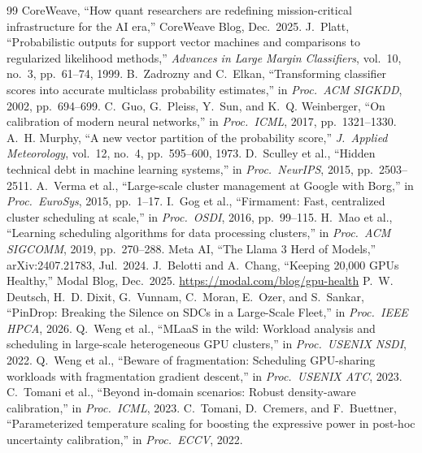 \documentclass[conference]{IEEEtran}
\begin{document}
\enlargethispage{3\baselineskip}
{\footnotesize
\begin{thebibliography}{99}
\itemsep-1.5pt\relax
{} CoreWeave, ``How quant researchers are redefining mission-critical infrastructure for the AI era,'' CoreWeave Blog, Dec.\ 2025.
 J.~Platt, ``Probabilistic outputs for support vector machines and comparisons to regularized likelihood methods,'' \emph{Advances in Large Margin Classifiers}, vol.~10, no.~3, pp.~61--74, 1999.
 B.~Zadrozny and C.~Elkan, ``Transforming classifier scores into accurate multiclass probability estimates,'' in \emph{Proc.\ ACM SIGKDD}, 2002, pp.~694--699.
 C.~Guo, G.~Pleiss, Y.~Sun, and K.~Q. Weinberger, ``On calibration of modern neural networks,'' in \emph{Proc.\ ICML}, 2017, pp.~1321--1330.
 A.~H. Murphy, ``A new vector partition of the probability score,'' \emph{J.\ Applied Meteorology}, vol.~12, no.~4, pp.~595--600, 1973.
 D.~Sculley et al., ``Hidden technical debt in machine learning systems,'' in \emph{Proc.\ NeurIPS}, 2015, pp.~2503--2511.
 A.~Verma et al., ``Large-scale cluster management at Google with Borg,'' in \emph{Proc.\ EuroSys}, 2015, pp.~1--17.
 I.~Gog et al., ``Firmament: Fast, centralized cluster scheduling at scale,'' in \emph{Proc.\ OSDI}, 2016, pp.~99--115.
 H.~Mao et al., ``Learning scheduling algorithms for data processing clusters,'' in \emph{Proc.\ ACM SIGCOMM}, 2019, pp.~270--288.
 Meta AI, ``The Llama 3 Herd of Models,'' arXiv:2407.21783, Jul.\ 2024.
 J.~Belotti and A.~Chang, ``Keeping 20{,}000 GPUs Healthy,'' Modal Blog, Dec.\ 2025. \url{https://modal.com/blog/gpu-health}
 P.~W. Deutsch, H.~D. Dixit, G.~Vunnam, C.~Moran, E.~Ozer, and S.~Sankar, ``PinDrop: Breaking the Silence on SDCs in a Large-Scale Fleet,'' in \emph{Proc.\ IEEE HPCA}, 2026.
 Q.~Weng et al., ``MLaaS in the wild: Workload analysis and scheduling in large-scale heterogeneous GPU clusters,'' in \emph{Proc.\ USENIX NSDI}, 2022.
 Q.~Weng et al., ``Beware of fragmentation: Scheduling GPU-sharing workloads with fragmentation gradient descent,'' in \emph{Proc.\ USENIX ATC}, 2023.
 C.~Tomani et al., ``Beyond in-domain scenarios: Robust density-aware calibration,'' in \emph{Proc.\ ICML}, 2023.
 C.~Tomani, D.~Cremers, and F.~Buettner, ``Parameterized temperature scaling for boosting the expressive power in post-hoc uncertainty calibration,'' in \emph{Proc.\ ECCV}, 2022.

\end{thebibliography}}
\end{document}
